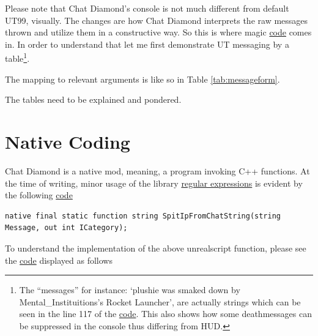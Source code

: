 \documentclass{article}
\theoremstyle{definition}
\begin{document}
Please note that Chat Diamond's console is not much different from default UT99, visually.  The changes are how Chat Diamond interprets the raw messages thrown and utilize them in a constructive way. So this is where magic \href{https://github.com/ravimohan1991/ChatDiamond/blob/859323fbd80266b21c9dab163b067cacfa318463/Classes/CDUTConsole.uc#L52-L71}{code} comes in.  In order to understand that let me first demonstrate UT messaging by a table\footnote{\label{foot:hudconsolediff} The ``messages'' for instance: `plushie was smaked down by Mental\_Instituitions's Rocket Launcher', are actually strings which can be seen in the line 117 of the \href{http://uncodex.ut-files.com/UT/v436/Source_botpack/deathmessageplus.html}{code}.  This also shows how some deathmessages can be suppressed in the console thus differing from HUD.}.

The mapping to relevant arguments is like so in Table \ref{tab:messageform}.


The tables need to be explained and pondered.

\section{Native Coding}
Chat Diamond is a native mod, meaning, a program invoking C++ functions.  At the time of writing, minor usage of the library 
\href{https://en.cppreference.com/w/cpp/regex}{regular expressions} is evident by the following \href{https://github.com/ravimohan1991/ChatDiamond/blob/6e3b684403fb75811c1cde6372c9125370bc796a/Classes/CDDiscordActor.uc#L61}{code}

\begin{lstlisting}[frame=single]
native final static function string SpitIpFromChatString(string Message, out int ICategory);
\end{lstlisting}

To understand the implementation of the above unrealscript function, please see the \href{https://github.com/ravimohan1991/ChatDiamond/blob/6e3b684403fb75811c1cde6372c9125370bc796a/UTNativeEssentials/ChatDiamond/Src/ChatDiamondNative.cpp#L52}{code} displayed as follows
\end{document}
